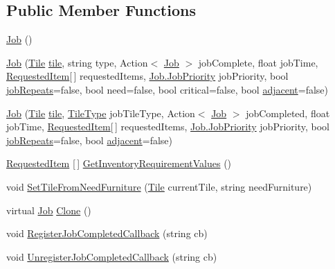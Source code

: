 \subsection*{Public Member Functions}
\begin{DoxyCompactItemize}
\item 
\hyperlink{class_job_ab0be2e41ce656169b55e1017185479d3}{Job} ()
\item 
\hyperlink{class_job_a67710e7b5957e833e85730b6871b76e9}{Job} (\hyperlink{class_tile}{Tile} \hyperlink{class_job_a36c037d122ff255572942f7d3c949bbd}{tile}, string type, Action$<$ \hyperlink{class_job}{Job} $>$ job\+Complete, float job\+Time, \hyperlink{class_project_porcupine_1_1_jobs_1_1_requested_item}{Requested\+Item}\mbox{[}$\,$\mbox{]} requested\+Items, \hyperlink{class_job_a9c7ab1966c2a0a1d29a7f5822cbca45a}{Job.\+Job\+Priority} job\+Priority, bool \hyperlink{class_job_a6987ac66f301cfb576dac72451328b39}{job\+Repeats}=false, bool need=false, bool critical=false, bool \hyperlink{class_job_a68dea057c25e34f4d55cb70e913991a8}{adjacent}=false)
\item 
\hyperlink{class_job_af831acec06ac9895b3e6fb0dccb412b7}{Job} (\hyperlink{class_tile}{Tile} \hyperlink{class_job_a36c037d122ff255572942f7d3c949bbd}{tile}, \hyperlink{class_tile_type}{Tile\+Type} job\+Tile\+Type, Action$<$ \hyperlink{class_job}{Job} $>$ job\+Completed, float job\+Time, \hyperlink{class_project_porcupine_1_1_jobs_1_1_requested_item}{Requested\+Item}\mbox{[}$\,$\mbox{]} requested\+Items, \hyperlink{class_job_a9c7ab1966c2a0a1d29a7f5822cbca45a}{Job.\+Job\+Priority} job\+Priority, bool \hyperlink{class_job_a6987ac66f301cfb576dac72451328b39}{job\+Repeats}=false, bool \hyperlink{class_job_a68dea057c25e34f4d55cb70e913991a8}{adjacent}=false)
\item 
\hyperlink{class_project_porcupine_1_1_jobs_1_1_requested_item}{Requested\+Item} \mbox{[}$\,$\mbox{]} \hyperlink{class_job_adc2a081cf8637f97602878516118facb}{Get\+Inventory\+Requirement\+Values} ()
\item 
void \hyperlink{class_job_a4c742512928b31d7aed1751e3c110cf3}{Set\+Tile\+From\+Need\+Furniture} (\hyperlink{class_tile}{Tile} current\+Tile, string need\+Furniture)
\item 
virtual \hyperlink{class_job}{Job} \hyperlink{class_job_a76133c61d72b667905bef919a50b8c34}{Clone} ()
\item 
void \hyperlink{class_job_ac763d2ee96f8dee66d67122dd1667bc4}{Register\+Job\+Completed\+Callback} (string cb)
\item 
void \hyperlink{class_job_a97e78583a5f2291a03499e485109499e}{Unregister\+Job\+Completed\+Callback} (string cb)

\end{DoxyCompactItemize}
